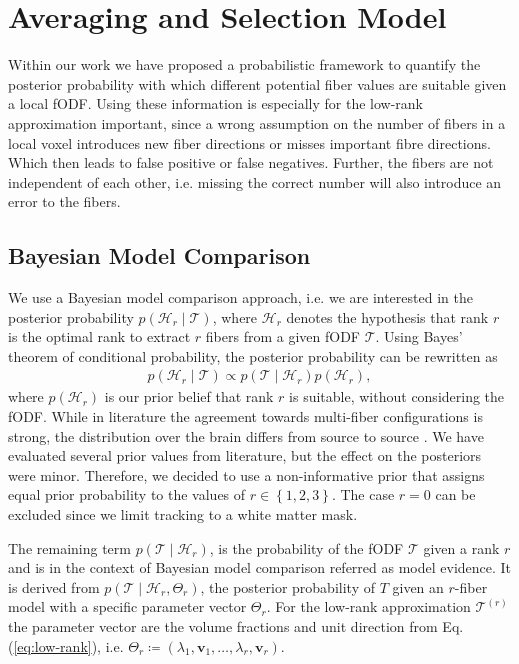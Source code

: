 \section{Averaging and Selection Model}\label{sec:Models}

Within our work we have proposed a probabilistic framework
to quantify the posterior probability with which different potential fiber values
are suitable given a local fODF.
Using these information is especially for the low-rank approximation important,
since a wrong assumption on the number of fibers in a local voxel introduces new
fiber directions or misses important fibre directions. Which then leads to false
positive or false negatives. Further, the fibers are not independent of each
other, i.e. missing the correct number will also introduce an error to the
fibers.

\subsection{Bayesian Model Comparison}
We use a Bayesian model comparison approach, i.e. we are interested in the
posterior probability $p \left( \mathcal{H}_r \mid \mathcal{T} \right)$, where
$\mathcal{H}_r$ denotes the hypothesis that rank $r$ is the optimal rank to
extract $r$ fibers from a given fODF $\mathcal{T}$. Using Bayes' theorem of
conditional probability, the posterior probability can be rewritten as
\begin{align}
	p \left( \mathcal{H}_r \mid \mathcal{T} \right) \propto p \left(
		\mathcal{T} \mid \mathcal{H}_r 
	\right) p \left(  \mathcal{H}_r \right), 
	\label{eq:Bayes}
\end{align}
where $p \left(  \mathcal{H}_r \right)$ is our prior belief that rank $r$ is
suitable, without considering the fODF. While in literature the agreement
towards multi-fiber configurations is strong, the distribution over the brain
differs from source to source  \cite{BEHRENS2007144,Jeurissen:2012, Schultz:MICCAI12}. We have evaluated several  prior values from literature,
but the effect on the posteriors were minor. Therefore, we decided to use a
non-informative prior that assigns equal prior probability to the values of $r
\in \left\{ 1,2,3 \right\}$. The case $r=0$ can be excluded since we limit
tracking to a white matter mask. 

The remaining term $p \left( \mathcal{T} \mid \mathcal{H}_r \right)$, is the
probability of the fODF $\mathcal{T}$ given a rank $r$ and is in the context of
Bayesian model comparison referred as model evidence. It is derived from $p
\left( \mathcal{T} \mid \mathcal{H}_r , \Theta_r \right)$, the posterior
probability of $T$ given an $r$-fiber model with a specific parameter vector
$\Theta_r$. For the low-rank approximation $\mathcal{T}^{\left( r \right)}$ the
parameter vector are the volume fractions and unit direction from Eq.
(\ref{eq:low-rank}), i.e. $\Theta_r \coloneqq \left( \lambda_1 , \mathbf{v}_1 , \dots
, \lambda_r , \mathbf{v}_r \right)$. 


